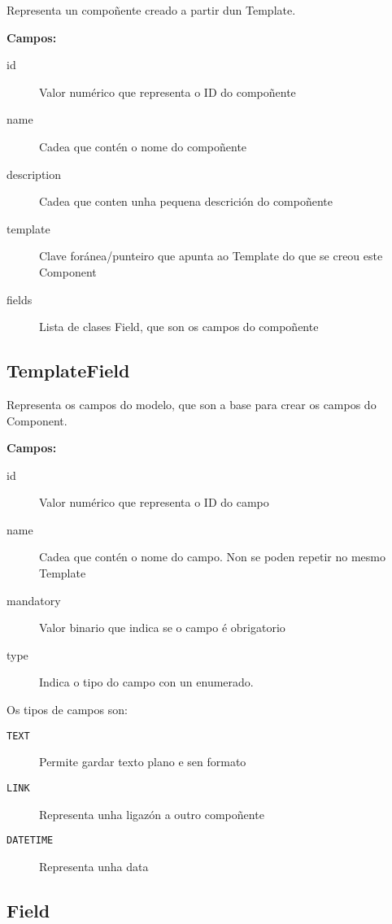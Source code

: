 Representa un compoñente creado a partir dun \Gls{Template}.

\textbf{Campos:}

\begin{description}
    \item[id] Valor numérico que representa o ID do compoñente
    \item[name] Cadea que contén o nome do compoñente
    \item[description] Cadea que conten unha pequena descrición do compoñente
    \item[template] Clave foránea/punteiro que apunta ao \Gls{Template} do que se creou este Component
    \item[fields] Lista de clases \Gls{Field}, que son os campos do compoñente
\end{description}

\subsection{TemplateField}
\label{obx:tfield}

Representa os campos do modelo, que son a base para crear os campos do \Gls{Component}.

\textbf{Campos:}

\begin{description}
    \item[id] Valor numérico que representa o ID do campo
    \item[name] Cadea que contén o nome do campo. Non se poden repetir no mesmo \Gls{Template}
    \item[mandatory] Valor binario que indica se o campo é obrigatorio
    \item[type] Indica o tipo do campo con un enumerado.
\end{description}

Os tipos de campos son:

\begin{description}
    \item[\texttt{TEXT}] Permite gardar texto plano e sen formato
    \item[\texttt{LINK}] Representa unha ligazón a outro compoñente
    \item[\texttt{DATETIME}] Representa unha data
\end{description}

\subsection{Field}
\label{obx:field}

